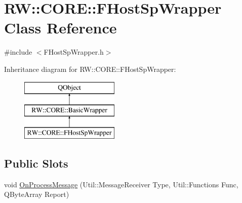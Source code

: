 \hypertarget{class_r_w_1_1_c_o_r_e_1_1_f_host_sp_wrapper}{}\section{RW\+:\+:C\+O\+RE\+:\+:F\+Host\+Sp\+Wrapper Class Reference}
\label{class_r_w_1_1_c_o_r_e_1_1_f_host_sp_wrapper}


{\ttfamily \#include $<$F\+Host\+Sp\+Wrapper.\+h$>$}

Inheritance diagram for RW\+:\+:C\+O\+RE\+:\+:F\+Host\+Sp\+Wrapper\+:\begin{figure}[H]
\begin{center}
\leavevmode
\includegraphics[height=3.000000cm]{class_r_w_1_1_c_o_r_e_1_1_f_host_sp_wrapper}
\end{center}
\end{figure}
\subsection*{Public Slots}
\begin{DoxyCompactItemize}
\item 
void \hyperlink{class_r_w_1_1_c_o_r_e_1_1_f_host_sp_wrapper_a60128d89802ee6ded357d3bfee856625}{On\+Process\+Message} (Util\+::\+Message\+Receiver Type, Util\+::\+Functions Func, Q\+Byte\+Array Report)
\end{DoxyCompactItemize}
